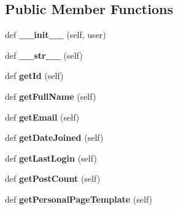 \subsection*{Public Member Functions}
\begin{DoxyCompactItemize}
\item 
\mbox{\label{classforum_1_1models_1_1_base_user_a75e56c934d4eb72413b0340232f5cd95}} 
def {\bfseries \+\_\+\+\_\+init\+\_\+\+\_\+} (self, user)
\item 
\mbox{\label{classforum_1_1models_1_1_base_user_a66440691da4e83708c24ff9b5cb4dbce}} 
def {\bfseries \+\_\+\+\_\+str\+\_\+\+\_\+} (self)
\item 
\mbox{\label{classforum_1_1models_1_1_base_user_ae5aa6c353d8ff26cbcfcd442973e7dda}} 
def {\bfseries get\+Id} (self)
\item 
\mbox{\label{classforum_1_1models_1_1_base_user_a2568f1227bda4c10506e4c3bc52df4d5}} 
def {\bfseries get\+Full\+Name} (self)
\item 
\mbox{\label{classforum_1_1models_1_1_base_user_a93a264581f387e4916daee7d089e19fe}} 
def {\bfseries get\+Email} (self)
\item 
\mbox{\label{classforum_1_1models_1_1_base_user_a7de34c1497e877f9ef64954e644bbaa7}} 
def {\bfseries get\+Date\+Joined} (self)
\item 
\mbox{\label{classforum_1_1models_1_1_base_user_a38de97471afad49cea24eb9bca8d27ac}} 
def {\bfseries get\+Last\+Login} (self)
\item 
\mbox{\label{classforum_1_1models_1_1_base_user_a025a83478de618f595225499af254840}} 
def {\bfseries get\+Post\+Count} (self)
\item 
\mbox{\label{classforum_1_1models_1_1_base_user_a57ef13fddb5eb37df09a387189894724}} 
def {\bfseries get\+Personal\+Page\+Template} (self)
\item 

\end{DoxyCompactItemize}
